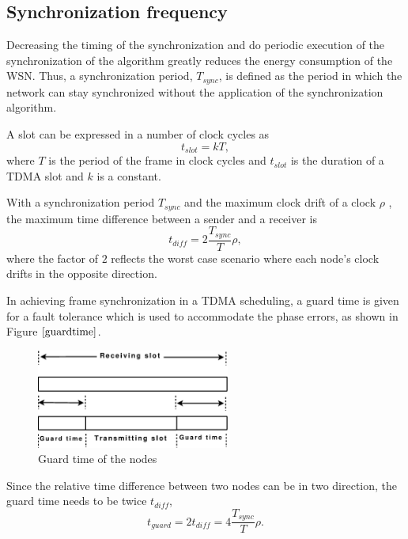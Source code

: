 \documentclass[journal]{IEEEtran}
\begin{document}
\subsection{\textbf{Synchronization frequency}}
Decreasing the timing of the synchronization and do periodic execution of the synchronization of the algorithm greatly reduces
the energy consumption of the WSN. Thus, a synchronization period, $T_{sync}$, is defined as the period in which the network can stay synchronized without the application of the synchronization algorithm.
\par A slot can be expressed in a
number of clock cycles as
\begin{equation}
t_{slot} = kT ,
\end{equation} where $T$ is the period of the frame in clock cycles and
$t_{slot}$ is the duration of a TDMA slot and $k$ is a constant.
\par With a synchronization period $T_{sync}$ and the
maximum clock drift of a clock $\rho$ , the maximum time difference
between a sender and a receiver is
\begin{equation}
t_{diff} = 2\frac{T_{sync}}{T}\rho ,
\end{equation}
where the factor of $2$ reflects the worst case scenario where each
node's clock drifts in the opposite direction.\par
In achieving frame synchronization in a TDMA scheduling, a guard time is given for a fault tolerance which is used to accommodate the
phase errors, as shown in Figure $\ref{guardtime}$.
\begin{figure}[t]
\centering
\includegraphics[width=2.5in]{guardtime}
\caption{Guard time of the nodes} \label{guardtime}
\end{figure}
Since the relative time difference between two nodes can be in two direction, the guard time needs to be twice $t_{diff}$,
\begin{equation}
t_{guard}= 2t_{diff} = 4\frac{T_{sync}}{T}\rho.
\end{equation}
\end{document}
